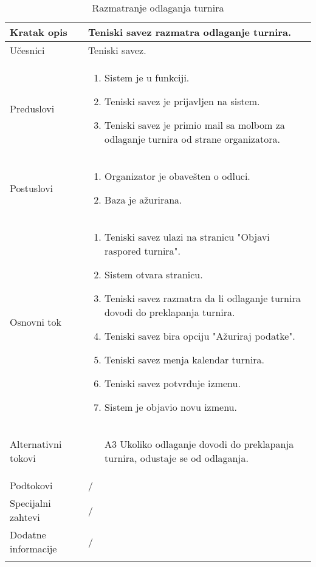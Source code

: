 \documentclass{article}
\begin{document}
 \begin{longtable}{| p{} | p{} |} 
            \hline
                Kratak opis & Teniski savez razmatra odlaganje turnira. \\ 
            \hline    
                Učesnici & Teniski savez.\\
            \hline
               Preduslovi & \begin{enumerate}
                   \item Sistem je u funkciji.
                   \item Teniski savez je prijavljen na sistem. 
                   \item Teniski savez je primio mail sa molbom za odlaganje turnira od strane organizatora.
                \end{enumerate}\\
            \hline  
                Postuslovi & \begin{enumerate}
                   \item Organizator je obavešten o odluci.
                   \item Baza je ažurirana. 
                \end{enumerate}\\
            \hline
                Osnovni tok & \begin{enumerate}
                    \item Teniski savez ulazi na stranicu "Objavi raspored turnira".
                    \item Sistem otvara stranicu.
                    \item Teniski savez razmatra da li odlaganje turnira dovodi do preklapanja turnira.
                    \item Teniski savez bira opciju "Ažuriraj podatke".
                    \item Teniski savez menja kalendar turnira.
                    \item Teniski savez potvrđuje izmenu.
                    \item Sistem je objavio novu izmenu.
                \end{enumerate}\\
            \hline
                Alternativni tokovi & 
                \begin{itemize}
                    \item[A3] Ukoliko odlaganje dovodi do preklapanja turnira, odustaje se od odlaganja.
                \end{itemize}\\
            \hline
                Podtokovi & /\\
            \hline
                Specijalni zahtevi & /\\
            \hline
                Dodatne informacije & /\\
            \hline
            \caption{Razmatranje odlaganja turnira}
        \end{longtable}
\end{document}
